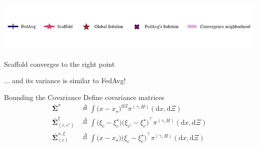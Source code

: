 \documentclass[aspectratio=169,12pt]{beamer}
\def\param{x}
\def\varparam{y}
\def\paramlim{x_\star}
\def\rmd{\mathrm{d}}
\def\eqdef{\overset{\Delta}{=}}
\def\step{\gamma}
\def\nlupdates{H}
\newcommand{\statdist}[1]{\pi^{(#1)}}
\newcommand{\statdistlim}[1]{\bar{x}_{\textnormal{sto}}^{(#1)}}
\newcommand{\covparam}{\bar{\boldsymbol{\Sigma}}^{x}}
\newcommand{\covparamcvar}[1]{\bar{\boldsymbol{\Sigma}}^{x,\xi}_{(#1)}}
\newcommand{\covcvar}[1]{\bar{\boldsymbol{\Sigma}}^{\xi}_{(#1)}}
\begin{document}
\begin{frame}[t]
\begin{center}
\vspace{-3em}

\includegraphics[width=\linewidth]{images/legend_fedavg_scaffold.pdf}    

\end{center}

  \vspace{-3em}
  \begin{center}
    Scaffold converges to the right point


    ... and its variance is similar to FedAvg!
  \end{center}


\end{frame}

\begin{frame}{Bounding the Covariance}
  Define covariance matrices
\begin{align*}
  \covparam &
\eqdef\! \int \big(\param - \paramlim\big)^{\otimes 2} \statdist{\step, \nlupdates}(\rmd \param, \rmd \Xi) 
  \\
  \covcvar{c,c'} 
& \eqdef 
\int \big( \xi_{c}{} \!- \xi_c^{\star} \big)
\big( \xi_{c'}{} \!- \xi_c^{\star} \big)^\top \statdist{\step, \nlupdates}( \rmd \param, \rmd \Xi )
\\
\covparamcvar{c}
& \eqdef{}\!
\int 
\big( \param - \paramlim \big) \big( \xi_{c}{} \!- \xi_{c}^{\star} \big)^\top 
\statdist{\step, \nlupdates}( \rmd \param, \rmd \Xi )
\end{align*}

\end{frame}
\end{document}

